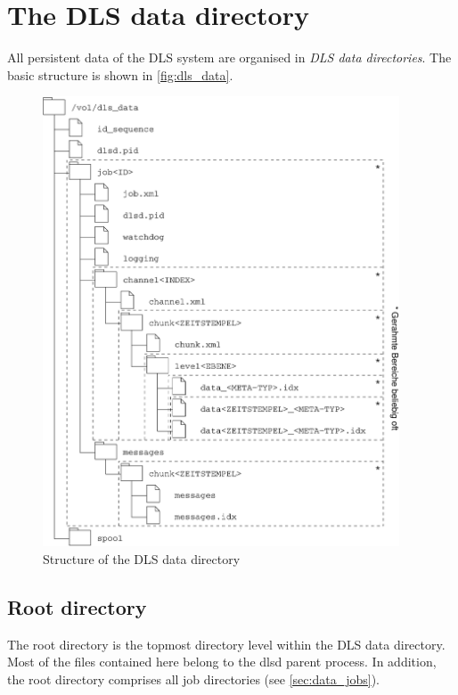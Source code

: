 \documentclass[a4paper,12pt,BCOR6mm,bibtotoc,idxtotoc]{scrbook}
\begin{document}

\chapter{The DLS data directory}
\label{sec:data}

All persistent data of the DLS system are organised in \textit{DLS data
directories}. The basic structure is shown in
\autoref{fig:dls_data}.

\begin{figure}[htb] \begin{center} \includegraphics[width=300pt]{bilder/dls_data} \end{center} \caption{Structure of the DLS data directory} \label{fig:dls_data} \end{figure}


\section{Root directory}
\label{sec:data_root}

The root directory is the topmost directory level within the DLS data
directory. Most of the files contained here belong to the dlsd parent process.
In addition, the root directory comprises all job directories (see
\autoref{sec:data_jobs}).
\end{document}

